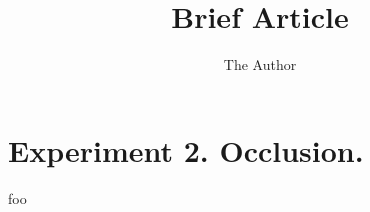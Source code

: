 \documentclass[11pt]{amsart}
\title{Brief Article}
\author{The Author}
\begin{document}
\section{Experiment 2. Occlusion.}

foo
\end{document}
